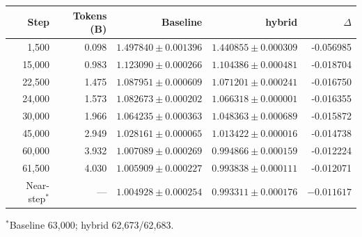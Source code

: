 \begin{tabular}{rrrrr}
\toprule
Step & Tokens (B) & Baseline & hybrid & $\Delta$ \\
\midrule
1,500 & 0.098 & $1.497840\pm0.001396$ & $1.440855\pm0.000309$ & -0.056985 \\
15,000 & 0.983 & $1.123090\pm0.000266$ & $1.104386\pm0.000481$ & -0.018704 \\
22,500 & 1.475 & $1.087951\pm0.000609$ & $1.071201\pm0.000241$ & -0.016750 \\
24,000 & 1.573 & $1.082673\pm0.000202$ & $1.066318\pm0.000001$ & -0.016355 \\
30,000 & 1.966 & $1.064235\pm0.000363$ & $1.048363\pm0.000689$ & -0.015872 \\
45,000 & 2.949 & $1.028161\pm0.000065$ & $1.013422\pm0.000016$ & -0.014738 \\
60,000 & 3.932 & $1.007089\pm0.000269$ & $0.994866\pm0.000159$ & -0.012224 \\
61,500 & 4.030 & $1.005909\pm0.000227$ & $0.993838\pm0.000111$ & -0.012071 \\
\midrule
Near-step$^*$ & --- & $1.004928\pm0.000254$ & $0.993311\pm0.000176$ & $-0.011617$ \\
\bottomrule
\end{tabular}
\par\vspace{2pt}\footnotesize $^*$Baseline 63,000; hybrid 62,673/62,683.